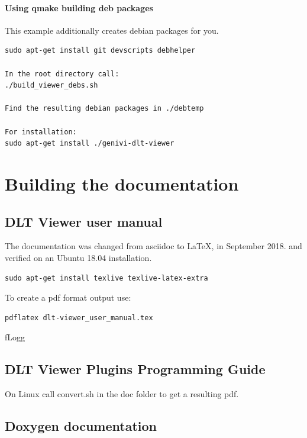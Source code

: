 \documentclass[a4paper,11pt]{article}
\begin{document}
\paragraph{Using qmake building deb packages}

This example additionally creates debian packages for you.\linebreak
\begin{verbatim}
sudo apt-get install git devscripts debhelper

In the root directory call:
./build_viewer_debs.sh

Find the resulting debian packages in ./debtemp

For installation:
sudo apt-get install ./genivi-dlt-viewer
\end{verbatim}

\pagebreak

\section{Building the documentation}

\subsection{DLT Viewer user manual}

The documentation was changed from asciidoc to  \LaTeX, in September 2018.\linebreak
and verified on an Ubuntu 18.04 installation.

\begin{verbatim}
sudo apt-get install texlive texlive-latex-extra
\end{verbatim}

To create a pdf format output use:
\begin{verbatim}
pdflatex dlt-viewer_user_manual.tex
\end{verbatim}fLogg

\subsection{DLT Viewer Plugins Programming Guide}

On Linux call convert.sh in the doc folder to get a resulting pdf.

\subsection{Doxygen documentation}
\end{document}
